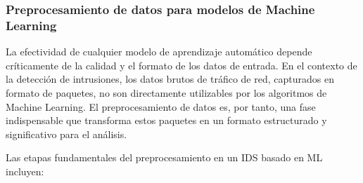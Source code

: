 \subsubsection{Preprocesamiento de datos para modelos de Machine Learning}

La efectividad de cualquier modelo de aprendizaje automático depende críticamente de la calidad y el formato de los datos de entrada. En el contexto de la detección de intrusiones, los datos brutos de tráfico de red, capturados en formato de paquetes, no son directamente utilizables por los algoritmos de Machine Learning. El preprocesamiento de datos es, por tanto, una fase indispensable que transforma estos paquetes en un formato estructurado y significativo para el análisis.

Las etapas fundamentales del preprocesamiento en un IDS basado en ML incluyen:

